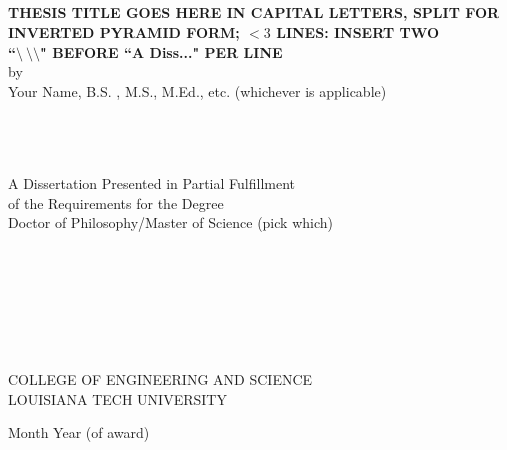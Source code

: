 \begin{center}\begin{singlespace}%
\ \\ %
\ \\ %
\ \\ %
\ \\ %
\end{singlespace}
{ \normalsize \textbf{
THESIS TITLE GOES HERE IN CAPITAL LETTERS, SPLIT FOR \\  %
INVERTED PYRAMID FORM; $<3$ LINES: INSERT TWO \\      %
``$\setminus \ \setminus \setminus $" BEFORE ``A Diss..." PER LINE
}} \\
by\\
Your Name, B.S. , M.S., M.Ed., etc. (whichever is applicable)
\vfill
\begin{singlespace}%
\ \\
\ \\
\ \\
A Dissertation Presented in Partial Fulfillment \\
of the Requirements for the Degree \\
Doctor of Philosophy/Master of Science (pick which) \\
\ \\
\ \\
\ \\
\ \\
\ \\
\ \\
\ \\
COLLEGE OF ENGINEERING AND SCIENCE\\
LOUISIANA TECH UNIVERSITY\\
\vfill

Month Year (of award)
\end{singlespace}
\end{center}



